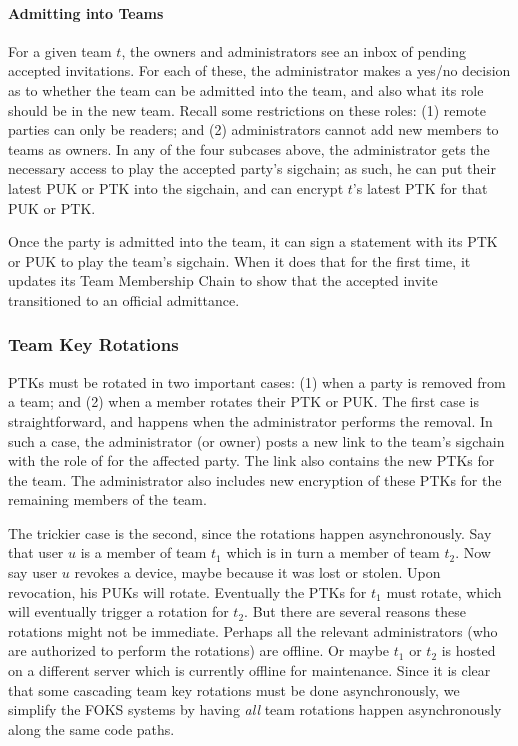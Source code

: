 \paragraph{Admitting into Teams}

For a given team $t$, the owners and administrators see an inbox of pending
accepted invitations. For each of these, the administrator makes a yes/no
decision as to whether the team can be admitted into the team, and also what
its role should be in the new team. Recall some restrictions on these roles: 
(1) remote parties can only be readers; and (2) administrators cannot add new
members to teams as owners. In any of the four subcases above, the administrator
gets the necessary access to play the accepted party's sigchain; as such,
he can put their latest PUK or PTK into the sigchain, and can encrypt
$t$'s latest PTK for that PUK or PTK.

Once the party is admitted into the team, it can sign a statement with its PTK
or PUK to play the team's sigchain. When it does that for the first time, it
updates its Team Membership Chain to show that the accepted invite transitioned
to an official admittance. 

\subsubsection{Team Key Rotations}
\label{sec:clkr}

PTKs must be rotated in two important cases: (1) when a party is removed from a team; and (2)
when a member rotates their PTK or PUK. The first case is straightforward, and happens
when the administrator performs the removal. In such a case, the administrator (or owner)
posts a new link to the team's sigchain with the role of \none{} for the affected party.
The link also contains the new PTKs for the team. The administrator also includes
new encryption of these PTKs for the remaining members of the team.

The trickier case is the second, since the rotations happen asynchronously. Say
that user $u$ is a member of team $t_1$ which is in turn a member of team $t_2$.
Now say user $u$ revokes a device, maybe because it was lost or stolen. Upon
revocation, his PUKs will rotate. Eventually the PTKs for $t_1$ must rotate,
which will eventually trigger a rotation for $t_2$. But there are several
reasons these rotations might not be immediate. Perhaps all the relevant
administrators (who are authorized to perform the rotations) are offline. Or
maybe $t_1$ or $t_2$ is hosted on a different server which is currently offline
for maintenance. Since it is clear that some cascading team key rotations must
be done asynchronously, we simplify the FOKS systems by having \textit{all} team
rotations happen asynchronously along the same code paths.


